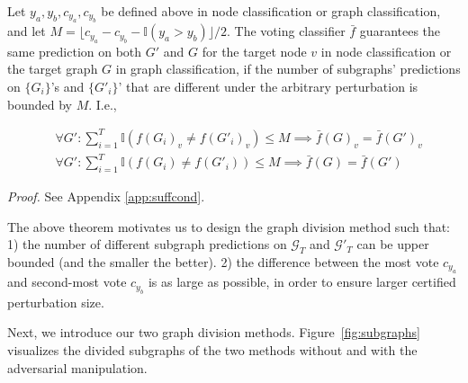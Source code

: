 \begin{theorem}
\label{thm:suffcond}
\vspace{-1mm}
Let $y_a, y_b, c_{y_a}, c_{y_b}$ be defined above in node classification or graph classification, and let $M = {\lfloor c_{y_a}-c_{y_b}-\mathbb{I}(y_{a}>y_{b})\rfloor} / {2}$. The voting classifier $\bar{f}$ guarantees the same prediction on both $G'$ and $G$ for the target node $v$ in node classification or the target graph $G$ in graph classification, if the number of subgraphs' predictions on $\{G_i\}$'s and $\{G'_i\}$' that are different under the arbitrary perturbation is bounded by $M$. I.e., 

{
\vspace{-4mm}
\small
\begin{align}
    & \forall G': \sum\nolimits_{i=1}^{T}\mathbb{I}(f(G_{i})_v\neq f(G'_{i})_v) \leq M \implies \bar{f}(G)_v = \bar{f}(G')_v \label{eqn:suff-NC} \\ 
    & \forall G': \sum\nolimits_{i=1}^{T}\mathbb{I}(f(G_{i}) \neq f(G'_{i})) \leq M  \implies \bar{f}(G) = \bar{f}(G')
    \label{eqn:suff-GC}
\end{align}
}
\end{theorem}

\noindent \emph{Proof.} See Appendix \ref{app:suffcond}. 

 
\vspace{+0.05in}
The above theorem motivates us to design the graph division method such that: 1) the number of different subgraph predictions on $\mathcal{G}_T$ and $\mathcal{G}'_T$ can be upper bounded (and the smaller the better).  
2) the difference between the most vote $c_{y_a}$ and second-most vote  $c_{y_b}$ is as large as possible, in order to ensure larger certified perturbation size.  

Next, we introduce our two graph division methods.  
Figure~\ref{fig:subgraphs} visualizes the divided subgraphs of the two methods without and with the adversarial manipulation.  


